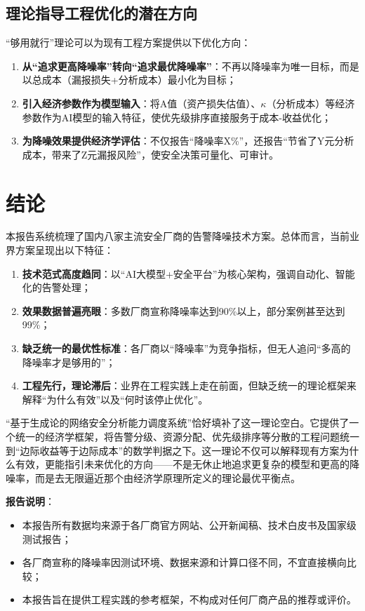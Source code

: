 \documentclass[11pt,a4paper]{article}
\begin{document}
\subsection{理论指导工程优化的潜在方向}

“够用就行”理论可以为现有工程方案提供以下优化方向：
\begin{enumerate}
    \item \textbf{从“追求更高降噪率”转向“追求最优降噪率”}：不再以降噪率为唯一目标，而是以总成本（漏报损失+分析成本）最小化为目标；
    \item \textbf{引入经济参数作为模型输入}：将A值（资产损失估值）、$\kappa$（分析成本）等经济参数作为AI模型的输入特征，使优先级排序直接服务于成本-收益优化；
    \item \textbf{为降噪效果提供经济学评估}：不仅报告“降噪率X\%”，还报告“节省了Y元分析成本，带来了Z元漏报风险”，使安全决策可量化、可审计。
\end{enumerate}

\section{结论}

本报告系统梳理了国内八家主流安全厂商的告警降噪技术方案。总体而言，当前业界方案呈现出以下特征：

\begin{enumerate}
    \item \textbf{技术范式高度趋同}：以“AI大模型+安全平台”为核心架构，强调自动化、智能化的告警处理；
    \item \textbf{效果数据普遍亮眼}：多数厂商宣称降噪率达到90\%以上，部分案例甚至达到99\%；
    \item \textbf{缺乏统一的最优性标准}：各厂商以“降噪率”为竞争指标，但无人追问“多高的降噪率才是够用的”；
    \item \textbf{工程先行，理论滞后}：业界在工程实践上走在前面，但缺乏统一的理论框架来解释“为什么有效”以及“何时该停止优化”。
\end{enumerate}

“基于生成论的网络安全分析能力调度系统”恰好填补了这一理论空白。它提供了一个统一的经济学框架，将告警分级、资源分配、优先级排序等分散的工程问题统一到“边际收益等于边际成本”的数学判据之下。这一理论不仅可以解释现有方案为什么有效，更能指引未来优化的方向——不是无休止地追求更复杂的模型和更高的降噪率，而是去无限逼近那个由经济学原理所定义的理论最优平衡点。

\vspace{5mm}
\noindent\textbf{报告说明}：
\begin{itemize}
    \item 本报告所有数据均来源于各厂商官方网站、公开新闻稿、技术白皮书及国家级测试报告；
    \item 各厂商宣称的降噪率因测试环境、数据来源和计算口径不同，不宜直接横向比较；
    \item 本报告旨在提供工程实践的参考框架，不构成对任何厂商产品的推荐或评价。
\end{itemize}
\end{document}
